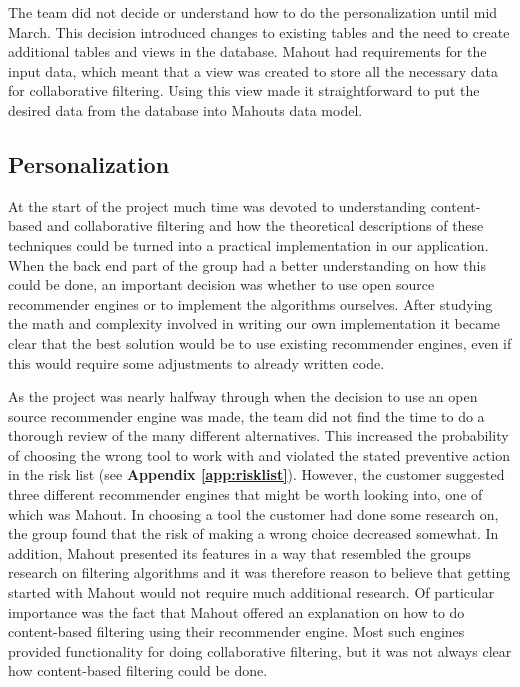The team did not decide or understand how to do the personalization until mid March. This decision introduced changes to existing tables and the need to create additional tables and views in the database. Mahout had requirements for the input data, which meant that a view was created to store all the necessary data for collaborative filtering. Using this view made it straightforward to put the desired data from the database into Mahouts data model.

\subsection{Personalization}

At the start of the project much time was devoted to understanding content-based and collaborative filtering and how the theoretical descriptions of these techniques could be turned into a practical implementation in our application. When the back end part of the group had a better understanding on how this could be done, an important decision was whether to use open source recommender engines or to implement the algorithms ourselves. After studying the math and complexity involved in writing our own implementation it became clear that the best solution would be to use existing recommender engines, even if this would require some adjustments to already written code. \newline

As the project was nearly halfway through when the decision to use an open source recommender engine was made, the team did not find the time to do a thorough review of the many different alternatives. This increased the probability of choosing the wrong tool to work with and violated the stated preventive action in the risk list (see \textbf{Appendix \ref{app:risklist}}). However, the customer suggested three different recommender engines that might be worth looking into, one of which was Mahout. In choosing a tool the customer had done some research on, the group found that the risk of making a wrong choice decreased somewhat. In addition, Mahout presented its features in a way that resembled the groups research on filtering algorithms and it was therefore reason to believe that getting started with Mahout would not require much additional research. Of particular importance was the fact that Mahout offered an explanation on how to do content-based filtering using their recommender engine. Most such engines provided functionality for doing collaborative filtering, but it was not always clear how content-based filtering could be done.\newline

